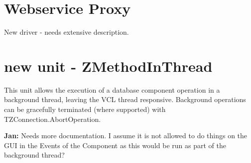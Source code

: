 \documentclass[a4paper,12pt,oneside]{article}
\begin{document}
\section{Webservice Proxy}
New driver - needs extensive description.

\section{new unit - ZMethodInThread}
This unit allows the execution of a database component operation in a background thread, leaving the VCL thread responsive.
Background operations can be gracefully terminated (where supported) with TZConnection.AbortOperation.

\textbf{Jan:}
Needs more documentation.
I assume it is not allowed to do things on the GUI in the Events of the Component as this would be run as part of the background thread?
\end{document}
